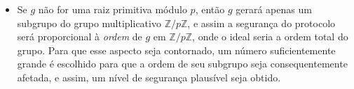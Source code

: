 \documentclass{../sftex/sftex}
\begin{document}
\begin{itemize}
\item Se $g$ não for uma raiz primitiva módulo $p$, então $g$ gerará apenas um
subgrupo do grupo multiplicativo $\mathbb{Z}/p\mathbb{Z}$, e assim a segurança
do protocolo será proporcional à \emph{ordem} de $g$ em
$\mathbb{Z}/p\mathbb{Z}$, onde o ideal seria a ordem total do grupo. Para que
esse aspecto seja contornado, um número suficientemente grande é escolhido para
que a ordem de seu subgrupo seja consequentemente afetada, e assim, um nível de
segurança plausível seja obtido.

\end{itemize}



\end{document}
